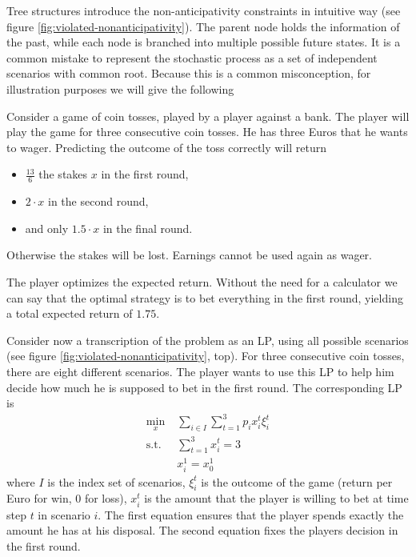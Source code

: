 Tree structures introduce the non-anticipativity constraints in intuitive way (see figure \ref{fig:violated-nonanticipativity}).
The parent node holds the information of the past, while each node is branched into multiple possible future states.
It is a common mistake to represent the stochastic process as a set of independent scenarios with common root.
Because this is a common misconception, for illustration purposes we will give the following
\begin{example}
  \label{ex:tree-necessity}
  Consider a game of coin tosses, played by a player against a bank.
  The player will play the game for three consecutive coin tosses.
  He has three Euros that he wants to wager.
  Predicting the outcome of the toss correctly will return
  \begin{itemize}
  \item $\frac{13}{6}$ the stakes $x$ in the first round,
  \item $2\cdot x$ in the second round,
  \item and only $1.5\cdot x$ in the final round.
  \end{itemize}
  Otherwise the stakes will be lost.
  Earnings cannot be used again as wager.

  The player optimizes the expected return.
  Without the need for a calculator we can say that the optimal strategy is to bet everything in the first round, yielding a total expected return of $1.75$.

  Consider now a transcription of the problem as an LP, using all possible scenarios (see figure \ref{fig:violated-nonanticipativity}, top).
  For three consecutive coin tosses, there are eight different scenarios.
  The player wants to use this LP to help him decide how much he is supposed to bet in the first round.
  The corresponding LP is
  \begin{align*}
    \min\limits_x &\; \sum_{i\in I}\sum_{t=1}^3p_ix_i^t \xi_i^t\\
    \text{s.t.} &\; \sum_{t=1}^3x_i^t = 3 \\
    & \; x_i^1 = x_0^1
  \end{align*}
  where $I$ is the index set of scenarios, $\xi_i^t$ is the outcome of the game (return per Euro for win, $0$ for loss), $x_i^t$ is the amount that the player is willing to bet at time step $t$ in scenario $i$. The first equation ensures that the player spends exactly the amount he has at his disposal. The second equation fixes the players decision in the first round.


\end{example}
